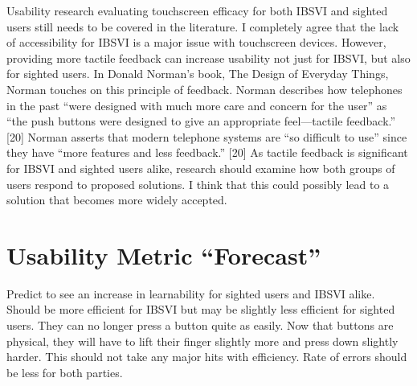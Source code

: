 \documentclass[11pt]{article}
\begin{document}
Usability research evaluating touchscreen efficacy for both IBSVI and sighted users
still needs to be covered in the literature. I completely agree that the lack of accessibility
for IBSVI is a major issue with touchscreen devices. However, providing more tactile
feedback can increase usability not just for IBSVI, but also for sighted users. In Donald
Norman’s book, The Design of Everyday Things, Norman touches on this principle of
feedback. Norman describes how telephones in the past “were designed with much
more care and concern for the user” as “the push buttons were designed to give an
appropriate feel—tactile feedback.” [20] Norman asserts that modern telephone systems
are “so difficult to use” since they have “more features and less feedback.” [20] As tactile
feedback is significant for IBSVI and sighted users alike, research should examine how
both groups of users respond to proposed solutions. I think that this could possibly
lead to a solution that becomes more widely accepted.


\section{Usability Metric ``Forecast''}
Predict to see an increase in learnability for sighted users and IBSVI alike. Should be more efficient for IBSVI but may be slightly less efficient for sighted users. They can no longer press a button quite as easily. Now that buttons are physical, they will have to lift their finger slightly more and press down slightly harder. This should not take any major hits with efficiency. Rate of errors should be less for both parties.
\clearpage


{}

\end{document}
